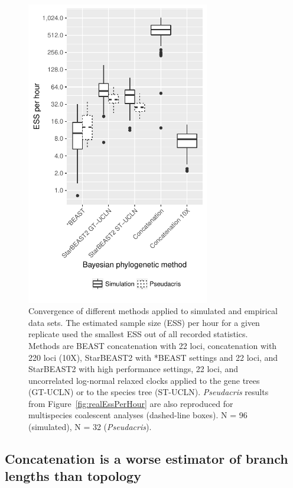 \documentclass[nogrid]{MBE}%
\begin{document}
\begin{figure}[htb!]
\centering
\includegraphics[width=8cm]{combined_ess_per_hour.pdf}
\caption
{Convergence of different methods applied to simulated and empirical data sets. The estimated sample size (ESS) per hour for a
given replicate used the smallest ESS out of all recorded statistics. Methods are
BEAST concatenation with 22 loci, concatenation with 220 loci (10X), StarBEAST2 with
*BEAST settings and 22 loci, and StarBEAST2 with high performance settings, 22 loci,
and uncorrelated log-normal relaxed clocks applied to the gene trees (GT-UCLN) or
to the species tree (ST-UCLN). \textit{Pseudacris} results from Figure~\ref{fig:realEssPerHour} are also reproduced for
multispecies coalescent analyses (dashed-line boxes). N = 96 (simulated), N = 32
(\textit{Pseudacris}).}
\label{fig:simulatedEssPerHour}
\end{figure}

\subsection{Concatenation is a worse estimator of branch lengths than topology}
\end{document}
